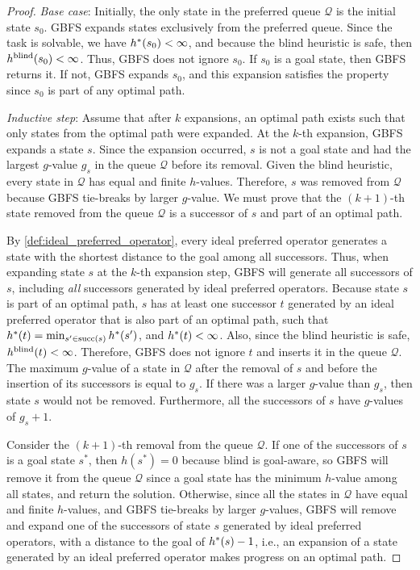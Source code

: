 \documentclass[ppgc,diss,english]{iiufrgs}
\begin{document}
\begin{proof}
\textit{Base case}: Initially, the only state in the preferred queue $\mathcal{Q}$ is the initial state $s_{0}$. GBFS expands states exclusively from the preferred queue. Since the task is solvable, we have $h^*({s_{0}}) < \infty$,  and because the blind heuristic is safe, then $h^{\text{blind}}(s_{0}) < \infty$. Thus, GBFS does not ignore $s_{0}$. If $s_{0}$ is a goal state, then GBFS returns it. If not, GBFS expands $s_{0}$, and this expansion satisfies the property since $s_{0}$ is part of any optimal path.

\textit{Inductive step}: Assume that after $k$ expansions, an optimal path exists such that only states from the optimal path were expanded. At the $k$-th expansion, GBFS expands a state $s$. Since the expansion occurred, $s$ is not a goal state and had the largest $g$-value $g_{s}$ in the queue $\mathcal{Q}$ before its removal. Given the blind heuristic, every state in $\mathcal{Q}$ has equal and finite $h$-values. Therefore, $s$ was removed from $\mathcal{Q}$ because GBFS tie-breaks by larger $g$-value. We must prove that the $(k+1)$-th state removed from the queue $\mathcal{Q}$ is a successor of $s$ and part of an optimal path.

By \cref{def:ideal_preferred_operator}, every ideal preferred operator generates a state with the shortest distance to the goal among all successors. Thus, when expanding state $s$ at the $k$-th expansion step, GBFS will generate all successors of $s$, including \emph{all} successors generated by ideal preferred operators. Because state $s$ is part of an optimal path, $s$ has at least one successor $t$ generated by an ideal preferred operator that is also part of an optimal path, such that $h^*({t}) = \min_{s' \in \operatorname{succ}(s)} h^*({s'})$, and $h^*({t}) < \infty$. Also, since the blind heuristic is safe, $h^{\text{blind}}(t) < \infty$. Therefore, GBFS does not ignore $t$ and inserts it in the queue $\mathcal{Q}$.
The maximum $g$-value of a state in $\mathcal{Q}$ after the removal of $s$ and before the insertion of its successors is equal to $g_{s}$. If there was a larger $g$-value than $g_{s}$, then state $s$ would not be removed. Furthermore, all the successors of $s$ have $g$-values of $g_{s} + 1$.

Consider the $(k+1)$-th removal from the queue $\mathcal{Q}$.
If one of the successors of $s$ is a goal state $s^{*}$, then $h(s^{*})=0$ because blind is goal-aware, so GBFS will remove it from the queue $\mathcal{Q}$ since a goal state has the minimum $h$-value among all states, and return the solution. Otherwise, since all the states in $\mathcal{Q}$ have equal and finite $h$-values, and GBFS tie-breaks by larger $g$-values, GBFS will remove and expand one of the successors of state $s$ generated by ideal preferred operators, with a distance to the goal of $h^*({s}) - 1$, i.e., an expansion of a state generated by an ideal preferred operator makes progress on an optimal path.


\end{proof}
\end{document}
